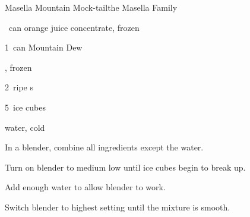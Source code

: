 \begin{recipe}{Masella Mountain Mock-tail}{the Masella Family}{}

\begin{ingredients}
\item \half~can orange juice concentrate, frozen
\item 1~can Mountain Dew
\item \C{\half} , frozen 
\item 2~ripe s
\item 5~ice cubes
\item water, cold 
\end{ingredients}

\begin{directions}
\item In a blender, combine all ingredients except the water.
\item Turn on blender to medium low until ice cubes begin to break up.
\item Add enough water to allow blender to work.
\item Switch blender to highest setting until the mixture is smooth.
\end{directions}

\end{recipe}
